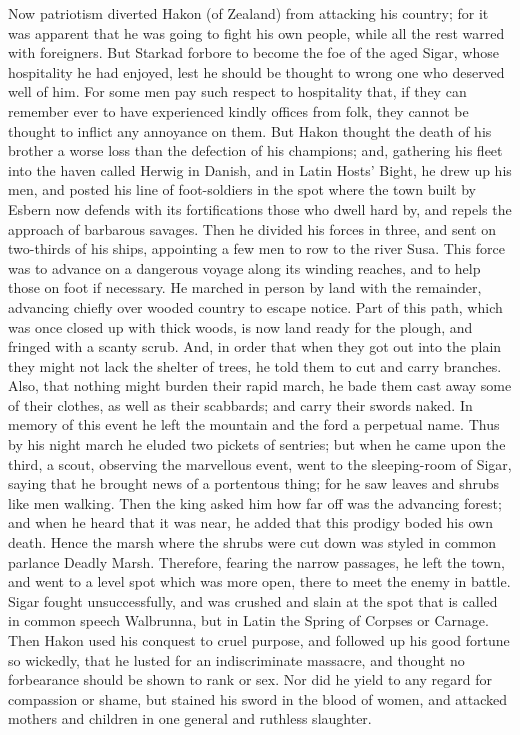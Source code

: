 \documentclass[10pt,a4paper]{report}
\begin{document}
Now patriotism diverted Hakon (of Zealand) from attacking his country; for it was apparent that he was going to fight his own people, while all the rest warred with foreigners. But Starkad forbore to become the foe of the aged Sigar, whose hospitality he had enjoyed, lest he should be thought to wrong one who deserved well of him. For some men pay such respect to hospitality that, if they can remember ever to have experienced kindly offices from folk, they cannot be thought to inflict any annoyance on them. But Hakon thought the death of his brother a worse loss than the defection of his champions; and, gathering his fleet into the haven called Herwig in Danish, and in Latin Hosts' Bight, he drew up his men, and posted his line of foot-soldiers in the spot where the town built by Esbern now defends with its fortifications those who dwell hard by, and repels the approach of barbarous savages. Then he divided his forces in three, and sent on two-thirds of his ships, appointing a few men to row to the river Susa. This force was to advance on a dangerous voyage along its winding reaches, and to help those on foot if necessary. He marched in person by land with the remainder, advancing chiefly over wooded country to escape notice. Part of this path, which was once closed up with thick woods, is now land ready for the plough, and fringed with a scanty scrub. And, in order that when they got out into the plain they might not lack the shelter of trees, he told them to cut and carry branches. Also, that nothing might burden their rapid march, he bade them cast away some of their clothes, as well as their scabbards; and carry their swords naked. In memory of this event he left the mountain and the ford a perpetual name. Thus by his night march he eluded two pickets of sentries; but when he came upon the third, a scout, observing the marvellous event, went to the sleeping-room of Sigar, saying that he brought news of a portentous thing; for he saw leaves and shrubs like men walking. Then the king asked him how far off was the advancing forest; and when he heard that it was near, he added that this prodigy boded his own death. Hence the marsh where the shrubs were cut down was styled in common parlance Deadly Marsh. Therefore, fearing the narrow passages, he left the town, and went to a level spot which was more open, there to meet the enemy in battle. Sigar fought unsuccessfully, and was crushed and slain at the spot that is called in common speech Walbrunna, but in Latin the Spring of Corpses or Carnage. Then Hakon used his conquest to cruel purpose, and followed up his good fortune so wickedly, that he lusted for an indiscriminate massacre, and thought no forbearance should be shown to rank or sex. Nor did he yield to any regard for compassion or shame, but stained his sword in the blood of women, and attacked mothers and children in one general and ruthless slaughter.\\
\end{document}

